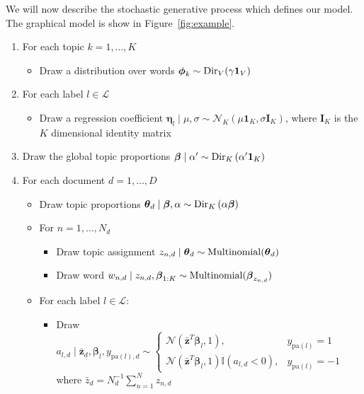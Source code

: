 We will now describe the stochastic generative process which defines
our model. The graphical model is show in Figure~\ref{fig:example}.

\begin{enumerate}
\item For each topic $k=1,\ldots,K$

\begin{itemize}
\item Draw a distribution over words $\boldsymbol\phi_{k}\sim{\rm Dir}_{V}(\gamma\mathbf{1}_V)$%
\end{itemize}
\item For each label $l\in\mathcal{L}$

\begin{itemize}
\item Draw a regression coefficient $\boldsymbol\eta_{l}\mid\mu,\sigma\sim\mathcal{N}_{K}(\mu \mathbf{1}_K,\sigma \mathbf{I}_{K})$,
where $\mathbf{I}_{K}$ is the $K$ dimensional identity matrix 
\end{itemize}
\item Draw the global topic proportions $\boldsymbol\beta\mid\alpha'\sim{\rm Dir}_{K}\left(\alpha^{\prime}\mathbf{1}_K\right)$
\item For each document $d=1,\ldots,D$

\begin{itemize}
\item Draw topic proportions $\boldsymbol\theta_d\mid\boldsymbol\beta,\alpha\sim{\rm Dir}_{K}\left(\alpha\boldsymbol\beta\right)$ 
\item For $n=1,\ldots,N_{d}$

\begin{itemize}
\item Draw topic assignment $z_{n,d}\mid\boldsymbol\theta_d\sim{\rm Multinomial}(\boldsymbol\theta_d)$ 
\item Draw word $w_{n,d}\mid z_{n,d},\boldsymbol\beta_{1:K}\sim{\rm Multinomial}(\boldsymbol\beta_{z_{n,d}})$ 
\end{itemize}
\item For each label $l\in\mathcal{L}$: 

\begin{itemize}
\item Draw $a_{l,d}\mid \bar{\mathbf{z}}_d,\boldsymbol\beta_{l},y_{\mathrm{pa}(l),d}\sim\begin{cases}
\mathcal{N}(\bar{\mathbf{z}}^{T}\boldsymbol\beta_{l},1), & y_{\mathrm{pa}(l)}=1\\
\mathcal{N}(\bar{\mathbf{z}}^{T}\boldsymbol\beta_{l},1)\mathbb{I}(a_{l,d}<0), & y_{\mathrm{pa}(l)}=-1\end{cases}$ \\where $\bar{z}_{d}=N_{d}^{-1}\sum_{n=1}^{N}z_{n,d}$ %
 

\end{itemize}
\end{itemize}
\end{enumerate}

